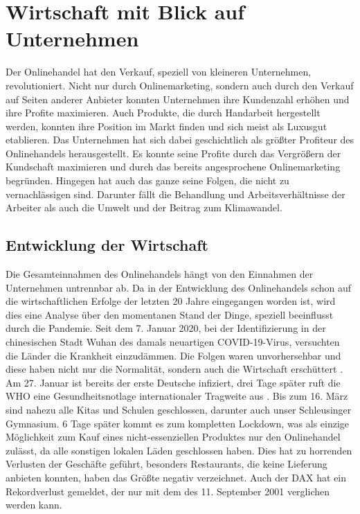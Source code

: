 \documentclass[a4paper, 12pt]{scrartcl}
\begin{document}
        \newpage
            
            
            
    \section{Wirtschaft mit Blick auf Unternehmen}
    
    
    
    
    
    Der Onlinehandel hat den Verkauf, speziell von kleineren Unternehmen, revolutioniert. Nicht nur durch Onlinemarketing, sondern auch durch den Verkauf auf Seiten anderer Anbieter konnten Unternehmen ihre Kundenzahl erhöhen und ihre Profite maximieren. Auch Produkte, die durch Handarbeit hergestellt werden, konnten ihre Position im Markt finden und sich meist als Luxusgut etablieren. Das Unternehmen hat sich dabei geschichtlich als größter Profiteur des Onlinehandels herausgestellt. Es konnte seine Profite durch das Vergrößern der Kundschaft maximieren und durch das bereits angesprochene Onlinemarketing begründen. Hingegen hat auch das ganze seine Folgen, die nicht zu vernachlässigen sind. Darunter fällt die Behandlung und Arbeitsverhältnisse der Arbeiter als auch die Umwelt und der Beitrag zum Klimawandel.

    
    
    
    
        \subsection{Entwicklung der Wirtschaft}
        
        
        
        
        
        Die Gesamteinnahmen des Onlinehandels hängt von den Einnahmen der Unternehmen untrennbar ab. Da in der Entwicklung des Onlinehandels schon auf die wirtschaftlichen Erfolge der letzten 20 Jahre eingegangen worden ist, wird dies eine Analyse über den momentanen Stand der Dinge, speziell beeinflusst durch die Pandemie.
Seit dem 7. Januar 2020, bei der Identifizierung in der chinesischen Stadt Wuhan des damals neuartigen COVID-19-Virus, versuchten die Länder die Krankheit einzudämmen. Die Folgen waren unvorhersehbar und diese haben nicht nur die Normalität, sondern auch die Wirtschaft erschüttert \cite{who}. Am 27. Januar ist bereits der erste Deutsche infiziert, drei Tage später ruft die WHO eine Gesundheitsnotlage internationaler Tragweite aus \cite{mdr-aktuell}. Bis zum 16. März sind nahezu alle Kitas und Schulen geschlossen, darunter auch unser Schleusinger Gymnasium. 6 Tage später kommt es zum kompletten Lockdown, was als einzige Möglichkeit zum Kauf eines nicht-essenziellen Produktes nur den Onlinehandel zulässt, da alle sonstigen lokalen Läden geschlossen haben. Dies hat zu horrenden Verlusten der Geschäfte geführt, besonders Restaurants, die keine Lieferung anbieten konnten, haben das Größte negativ verzeichnet. Auch der DAX hat ein Rekordverlust gemeldet, der nur mit dem des 11. September 2001 verglichen werden kann.
\end{document}
